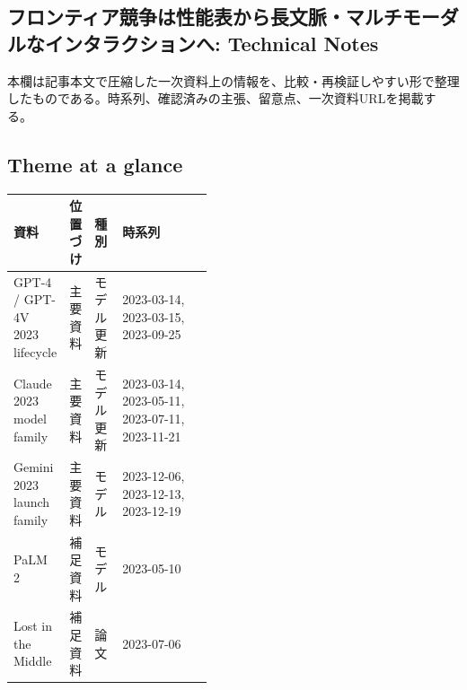 \subsection*{フロンティア競争は性能表から長文脈・マルチモーダルなインタラクションへ: Technical Notes}
本欄は記事本文で圧縮した一次資料上の情報を、比較・再検証しやすい形で整理したものである。時系列、確認済みの主張、留意点、一次資料URLを掲載する。
\smallskip
{}\par
\medskip
\subsection*{Theme at a glance}
\begin{center}
\footnotesize
\begin{tabularx}{\linewidth}{@{}p{0.20\linewidth}p{0.10\linewidth}p{0.14\linewidth}X@{}}
\toprule
資料 & 位置づけ & 種別 & 時系列 \\
\midrule
GPT-4 / GPT-4V 2023 lifecycle & 主要資料 & モデル更新 & 2023-03-14, 2023-03-15, 2023-09-25 \\
Claude 2023 model family & 主要資料 & モデル更新 & 2023-03-14, 2023-05-11, 2023-07-11, 2023-11-21 \\
Gemini 2023 launch family & 主要資料 & モデル & 2023-12-06, 2023-12-13, 2023-12-19 \\
PaLM 2 & 補足資料 & モデル & 2023-05-10 \\
Lost in the Middle & 補足資料 & 論文 & 2023-07-06 \\
\bottomrule
\end{tabularx}
\end{center}
\normalsize

